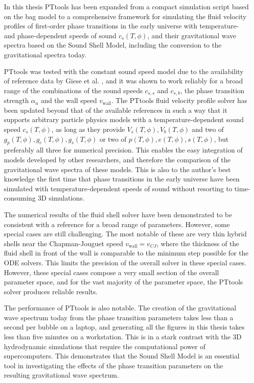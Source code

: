 In this thesis PTtools has been expanded from a compact simulation script based on the bag model
to a comprehensive framework for simulating the fluid velocity profiles of first-order phase transitions in the early universe
with temperature- and phase-dependent speeds of sound $c_s(T,\phi)$,
and their gravitational wave spectra based on the Sound Shell Model,
including the conversion to the gravitational spectra today.

PTtools was tested with the constant sound speed model due to the availability of reference data by Giese et al. \cite{giese_2021},
and it was shown to work reliably for a broad range of the combinations of the sound speeds $c_{s,s}$ and $c_{s,b}$, the phase transition strength $\alpha_n$ and the wall speed $v_\text{wall}$.
The PTtools fluid velocity profile solver has been updated beyond that of the available references in such a way
that it supports arbitrary particle physics models with a temperature-dependent sound speed $c_s(T,\phi)$,
as long as they provide $V_s(T,\phi), V_b(T,\phi)$ and two of $g_p(T,\phi), g_e(T,\phi), g_s(T,\phi)$ or two of $p(T,\phi), e(T,\phi), s(T,\phi)$, but preferably all three for numerical precision.
This enables the easy integration of models developed by other researchers,
and therefore the comparison of the gravitational wave spectra of these models.
This is also to the author's best knowledge the first time that phase transitions in the early universe have been simulated with temperature-dependent speeds of sound without resorting to time-consuming 3D simulations.

The numerical results of the fluid shell solver have been demonstrated to be consistent with a reference
for a broad range of parameters.
However, some special cases are still challenging.
The most notable of these are very thin hybrid shells near the Chapman-Jouguet speed $v_\text{wall} = v_{CJ}$,
where the thickness of the fluid shell in front of the wall is comparable to the minimum step possible for the ODE solvers.
This limits the precision of the overall solver in these special cases.
However, these special cases compose a very small section of the overall parameter space,
and for the vast majority of the parameter space,
the PTtools solver produces reliable results.

The performance of PTtools is also notable.
The creation of the gravitational wave spectrum today from the phase transition parameters takes less than a second per bubble on a laptop,
and generating all the figures in this thesis takes less than five minutes on a workstation.
This is in a stark contrast with the 3D hydrodynamic simulations that require the computational power of supercomputers.
This demonstrates that the Sound Shell Model is an essential tool in investigating
the effects of the phase transition parameters on the resulting gravitational wave spectrum.

